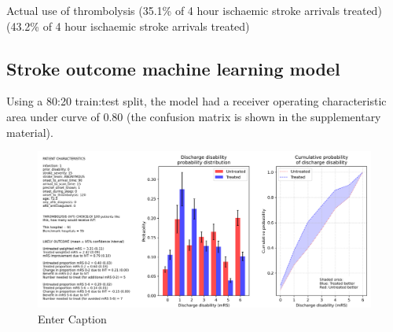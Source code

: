 Actual use of thrombolysis (35.1\% of 4 hour ischaemic stroke arrivals treated)
(43.2\% of 4 hour ischaemic stroke arrivals treated)

\subsection{Stroke outcome machine learning model}

Using a 80:20 train:test split, the model had a receiver operating characteristic area under curve of 0.80 (the confusion matrix is shown in the supplementary material).

\begin{figure}
    \centering
    \includegraphics[width=1.0\linewidth]{images/prototype_patient_ideal}
    \caption{Enter Caption}
    \label{fig:example_patient_outcome}
\end{figure}

